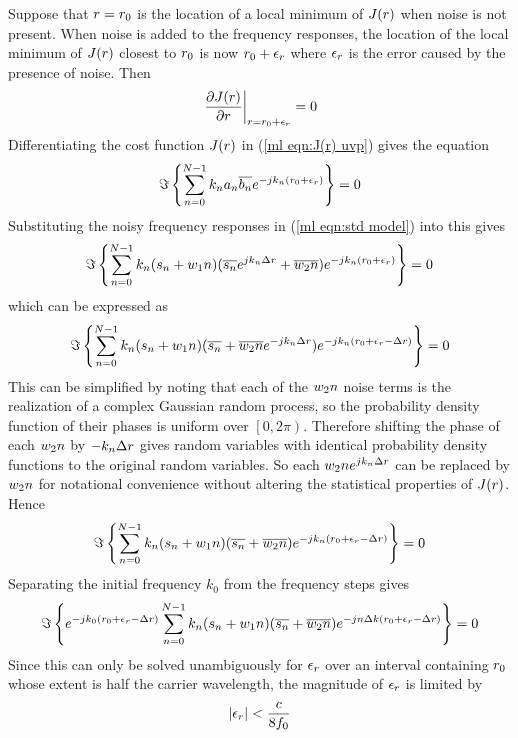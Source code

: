 Suppose that ${r}={r_0}$ is the location of a local minimum of $J({r})$ when
noise is not present.  When noise is added to the frequency responses, the
location of the local minimum of $J({r})$ closest to ${r_0}$ is now ${r_0}+\epsilon_r$
where $\epsilon_r$ is the error caused by the presence of noise. Then
\begin{equation}
\left.\frac{{\partial} J({r})}{{\partial} {r}}\right|_{{r}={r_0}+\epsilon_r}=0
\end{equation}
Differentiating the cost function $J({r})$ in (\ref{ml eqn:J(r) uvp}) gives
the equation
\begin{equation}
\Im\left\{\sum_{n=0}^{N-1} k_na_n\overline{b_n}{e^{-jk_n({r_0}+\epsilon_r)}}\right\}=0
\end{equation}
Substituting the noisy frequency responses in (\ref{ml eqn:std model}) into 
this gives
\begin{equation}
\Im\left\{\sum_{n=0}^{N-1} k_n(s_n+{w_1}{n})
(\overline{s_n}{e^{jk_n{\Delta r}}}+\overline{{w_2}{n}}){e^{-jk_n({r_0}+\epsilon_r)}}\right\}=0
\end{equation}
which can be expressed as
\begin{equation}
\Im\left\{\sum_{n=0}^{N-1} k_n(s_n+{w_1}{n})
(\overline{s_n}+\overline{{w_2}{n}}{e^{-jk_n{\Delta r}}}){e^{-jk_n({r_0}+\epsilon_r-{\Delta r})}}\right\}=0
\end{equation}
This can be simplified by noting that each of the ${w_2}{n}$ noise terms is
the realization of a complex Gaussian random process, so the probability
density function of their phases is uniform over $\left[0,2\pi\right)$. 
Therefore shifting the phase of each ${w_2}{n}$ by $-k_n{\Delta r}$ gives random
variables with identical probability density functions to the original random variables.
So each ${w_2}{n}{e^{jk_n{\Delta r}}}$ can be replaced by ${w_2}{n}$ for notational
convenience without altering the statistical properties of $J({r})$.  Hence
\begin{equation}
\Im\left\{\sum_{n=0}^{N-1} k_n(s_n+{w_1}{n})
(\overline{s_n}+\overline{{w_2}{n}}){e^{-jk_n({r_0}+\epsilon_r-{\Delta r})}}\right\}=0
\end{equation}
Separating the initial frequency $k_0$ from the frequency steps gives
\begin{equation}\label{sp app eqn:2nd exp}
\Im\left\{{e^{-jk_0({r_0}+\epsilon_r-{\Delta r})}}\sum_{n=0}^{N-1} k_n(s_n+{w_1}{n})
(\overline{s_n}+\overline{{w_2}{n}}){e^{-jn{\Delta k}({r_0}+\epsilon_r-{\Delta r})}}\right\}=0
\end{equation}
Since this can only be solved unambiguously for $\epsilon_r$ over an interval
containing ${r_0}$ whose extent is half the carrier wavelength, the magnitude
of $\epsilon_r$ is limited by
\begin{equation} 
\left|\epsilon_r\right|<\frac{c}{8f_0}
\end{equation}
